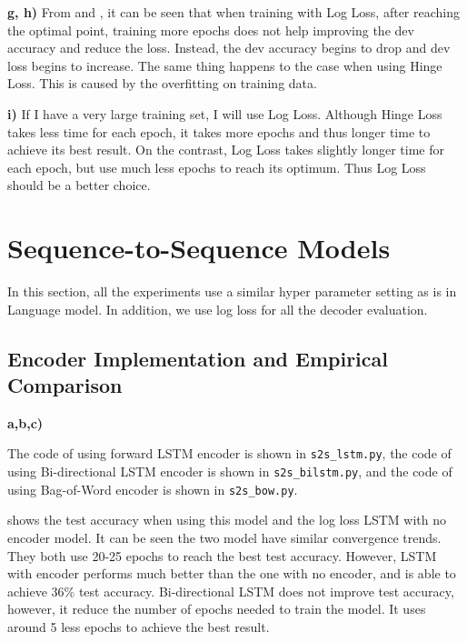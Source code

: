 \documentclass{article}
\begin{document}
\textbf{g, h)}
From  and , it can be seen that when training with Log Loss, after reaching the optimal point, training more epochs does not help improving the dev accuracy and reduce the loss. Instead, the dev accuracy begins to drop and dev loss begins to increase. The same thing happens to the case when using Hinge Loss. This is caused by the overfitting on training data.

\textbf{i)}
If I have a very large training set, I will use Log Loss. Although Hinge Loss takes less time for each epoch, it takes more epochs and thus longer time to achieve its best result. On the contrast, Log Loss takes slightly longer time for each epoch, but use much less epochs to reach its optimum. Thus Log Loss should be a better choice.

\section{Sequence-to-Sequence Models}
In this section, all the experiments use a similar hyper parameter setting as is in Language model. In addition, we use log loss for all the decoder evaluation.
\subsection{Encoder Implementation and Empirical Comparison}
\textbf{a,b,c)} 

The code of using forward LSTM encoder is shown in \texttt{s2s\_lstm.py}, 
the code of using Bi-directional LSTM encoder is shown in \texttt{s2s\_bilstm.py}, and 
the code of using Bag-of-Word encoder is shown in \texttt{s2s\_bow.py}. 

 shows the test accuracy when using this model and the log loss LSTM with no encoder model. It can be seen the two model have similar convergence trends. They both use 20-25 epochs to reach the best test accuracy. However, LSTM with encoder performs much better than the one with no encoder, and is able to achieve 36\% test accuracy. Bi-directional LSTM does not improve test accuracy, however, it reduce the number of epochs needed to train the model. It uses around 5 less epochs to achieve the best result. 
\end{document}
